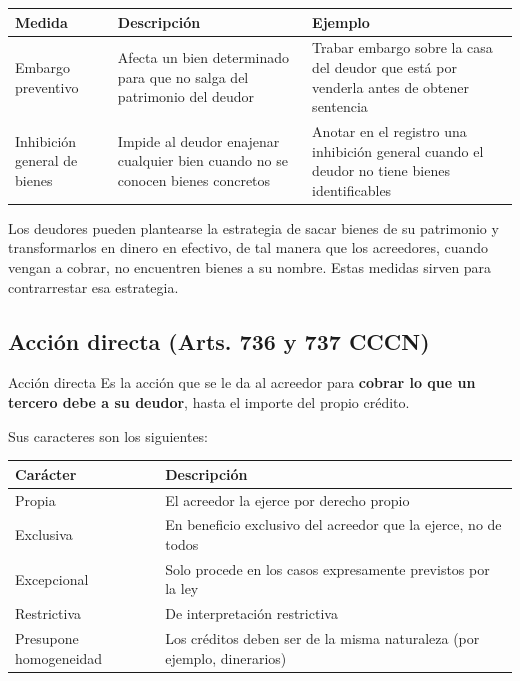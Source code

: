 \documentclass[12pt,oneside]{book}
\newenvironment{tabla}{%
    \par\medskip\begingroup\small\renewcommand{\arraystretch}{1.3}\noindent\ignorespaces
}{%
    \par\endgroup\medskip
}
\begin{document}
\begin{tabla}
\begin{tabularx}{\textwidth}{B{3.4cm}YY}
\toprule
Medida & \textbf{Descripción} & \textbf{Ejemplo} \\
\midrule
Embargo preventivo & Afecta un bien determinado para que no salga del patrimonio del deudor & Trabar embargo sobre la casa del deudor que está por venderla antes de obtener sentencia \\
Inhibición general de bienes & Impide al deudor enajenar cualquier bien cuando no se conocen bienes concretos & Anotar en el registro una inhibición general cuando el deudor no tiene bienes identificables \\
\bottomrule
\end{tabularx}
\end{tabla}

Los deudores pueden plantearse la estrategia de sacar bienes de su patrimonio y transformarlos en dinero en efectivo, de tal manera que los acreedores, cuando vengan a cobrar, no encuentren bienes a su nombre. Estas medidas sirven para contrarrestar esa estrategia.

\subsection{Acción directa (Arts. 736 y 737 CCCN)}

\begin{definition}{Acción directa}
Es la acción que se le da al acreedor para \textbf{cobrar lo que un tercero debe a su deudor}, hasta el importe del propio crédito.
\end{definition}

Sus caracteres son los siguientes:

\begin{tabla}
\begin{tabularx}{\textwidth}{B{3.6cm}Y}
\toprule
Carácter & \textbf{Descripción} \\
\midrule
Propia & El acreedor la ejerce por derecho propio \\
Exclusiva & En beneficio exclusivo del acreedor que la ejerce, no de todos \\
Excepcional & Solo procede en los casos expresamente previstos por la ley \\
Restrictiva & De interpretación restrictiva \\
Presupone homogeneidad & Los créditos deben ser de la misma naturaleza (por ejemplo, dinerarios) \\
\bottomrule
\end{tabularx}
\end{tabla}
\end{document}
